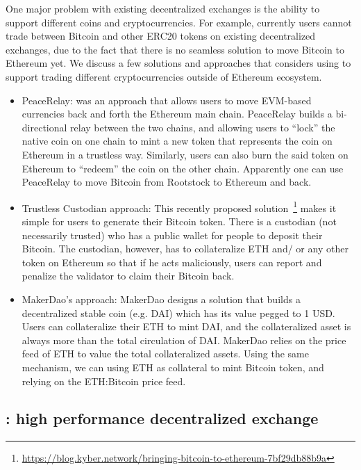 One major problem with existing decentralized exchanges is the ability to support different coins and cryptocurrencies. For example, currently users cannot trade between Bitcoin and other ERC20 tokens on existing decentralized exchanges, due to the fact that there is no seamless solution to move Bitcoin to Ethereum yet. We discuss a few solutions and approaches that \codename considers using to support trading different cryptocurrencies outside of Ethereum ecosystem.
\begin{itemize}

\item PeaceRelay: was an approach that allows users to move EVM-based currencies back and forth the Ethereum main chain. PeaceRelay builds a bi-directional relay between the two chains, and allowing users to “lock” the native coin on one chain to mint a new token that represents the coin on Ethereum in a trustless way. Similarly, users can also burn the said token on Ethereum to “redeem” the coin on the other chain. Apparently one can use PeaceRelay to move Bitcoin from Rootstock to Ethereum and back.

\item Trustless Custodian approach: This recently proposed solution~\footnote{\url{https://blog.kyber.network/bringing-bitcoin-to-ethereum-7bf29db88b9a}} makes it simple for users to generate their Bitcoin token. There is a custodian (not necessarily trusted) who has a public wallet for people to deposit their Bitcoin. The custodian, however, has to collateralize ETH and/ or any other token on Ethereum so that if he acts maliciously, users can report and penalize the validator to claim their Bitcoin back.

\item MakerDao’s approach: MakerDao designs a solution that builds a decentralized stable coin (e.g. DAI) which has its value pegged to 1 USD. Users can collateralize their ETH to mint DAI, and the collateralized asset is always more than the total circulation of DAI. MakerDao relies on the price feed of ETH to value the total collateralized assets. Using the same mechanism, we can using ETH as collateral to mint Bitcoin token, and relying on the ETH:Bitcoin price feed.
\end{itemize}

\subsection{\codename: high performance decentralized exchange}

